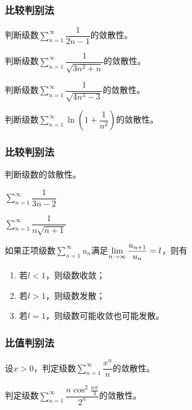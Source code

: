 \documentclass[14pt,notheorems,leqno,xcolor={rgb}]{beamer} %
\begin{document}
\begin{frame}
\frametitle{比较判别法}
\begin{example}
判断级数$\sum\limits_{n=1}^{\infty}\dfrac1{2n-1}$的敛散性。
\end{example}
\vpause
\begin{example}
判断级数$\sum\limits_{n=1}^{\infty}\dfrac1{\sqrt{3n^2+n}}$的敛散性。
\end{example}
\vpause
\begin{example}
判断级数$\sum\limits_{n=1}^{\infty}\dfrac1{\sqrt{4n^3-3}}$的敛散性。
\end{example}
\vpause
\begin{example}
判断级数$\sum\limits_{n=1}^{\infty}\ln\left(1+\dfrac1{n^2}\right)$的敛散性。
\end{example}
\end{frame}

\begin{frame}
\frametitle{比较判别法}
\begin{exercise}
判断级数的敛散性。
\begin{enumlite}
  \item $\sum\limits_{n=1}^{\infty}\dfrac1{3n-2}$
  \item $\sum\limits_{n=1}^{\infty}\dfrac1{n\sqrt{n+1}}$
\end{enumlite}
\end{exercise}
\end{frame}


\begin{frame}
\begin{theorem}[比值判别法]
如果正项级数$\sum\limits_{n=1}^{\infty}u_n$满足$\lim\limits_{n\to\infty}\dfrac{u_{n+1}}{u_n}=l$，则有
\begin{enumerate}[<+->]
  \item 若$l<1$，则级数收敛；
  \item 若$l>1$，则级数发散；
  \item 若$l=1$，则级数可能收敛也可能发散。
\end{enumerate}
\end{theorem}
\end{frame}

\begin{frame}
\frametitle{比值判别法}
\begin{example}
设$x>0$，判定级数$\sum\limits_{n=1}^{\infty}\dfrac{x^n}{n}$的敛散性。
\end{example}
\vpause
\begin{example}
判定级数$\sum\limits_{n=1}^{\infty}\dfrac{n\cos^2\frac{n\pi}3}{2^n}$的敛散性。
\end{example}
\end{frame}
\end{document}

